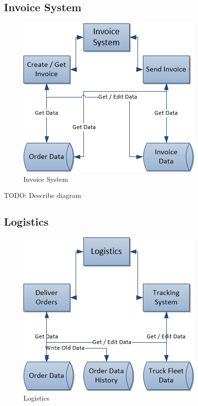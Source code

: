 \documentclass[11pt,a4paper,oneside,svgnames]{report}
\begin{document}
\subsection{Invoice System}
\begin{figure}[H]
 \begin{center}
  \includegraphics[width=\textwidth]{InvoiceSystem.png}
 \end{center}
 \caption{Invoice System}
\end{figure}

TODO: Describe diagram

\subsection{Logistics}
\begin{figure}[H]
 \begin{center}
  \includegraphics[width=\textwidth]{Logistics.png}
 \end{center}
 \caption{Logistics}
\end{figure}
\end{document}
